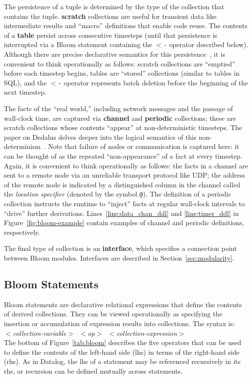 The persistence of a tuple is determined by the type of the collection that
contains the tuple. \textbf{scratch} collections are useful for transient data
like intermediate results and ``macro'' definitions that enable code reuse. The
contents of a \textbf{table} persist across consecutive timesteps (until that
persistence is interrupted via a Bloom statement containing the \texttt{$<$-}
operator described below). Although there are precise declarative semantics for
this persistence~\cite{dedalus}, it is convenient to think operationally as
follows: scratch collections are ``emptied'' before each timestep begins, tables
are ``stored'' collections (similar to tables in SQL), and the \texttt{$<$-}
operator represents batch deletion before the beginning of the next timestep.

The facts of the ``real world,'' including network messages and the passage of
wall-clock time, are captured via \textbf{channel} and \textbf{periodic}
collections; these are scratch collections whose contents ``appear'' at
non-deterministic timesteps.  The paper on Dedalus delves deeper into the
logical semantics of this non-determinism~\cite{dedalus}. Note that failure of
nodes or communication is captured here: it can be thought of as the repeated
``non-appearance'' of a fact at every timestep.  Again, it is convenient to
think operationally as follows: the facts in a channel are sent to a remote node
via an unreliable transport protocol like UDP; the address of the remote node is
indicated by a distinguished column in the channel called the \emph{location
  specifier} (denoted by the symbol \texttt{@}). The definition of a periodic
collection instructs the runtime to ``inject'' facts at regular wall-clock
intervals to ``drive'' further derivations. Lines~\ref{line:data_chan_ddl} and
\ref{line:timer_ddl} in Figure~\ref{fig:bloom-example} contain examples of
channel and periodic definitions, respectively.

The final type of collection is an \textbf{interface}, which specifies a
connection point between Bloom modules. Interfaces are described in
Section~\ref{sec:modularity}.

\subsection{Bloom Statements}
Bloom statements are declarative relational expressions that define the contents
of derived collections.  They can be viewed operationally as specifying the insertion or accumulation of expression results into collections.  The syntax
is:\\ \noindent
\mbox{\hspace{0.25in}\emph{$<$collection-variable$>$ $<$op$>$
$<$collection-expression$>$}}\\ \noindent
The bottom of Figure~\ref{tab:bloom} describes the five operators that can be
used to define the contents of the left-hand side (lhs) in terms of the
right-hand side (rhs). As in Datalog, the lhs of a statement may be referenced recursively in its rhs,
or recursion can be defined mutually across statements.

